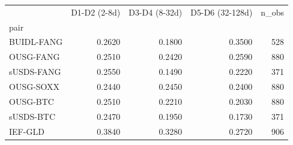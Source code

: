 \begin{tabular}{lrrrr}
\toprule
 & D1-D2 (2-8d) & D3-D4 (8-32d) & D5-D6 (32-128d) & n\_obs \\
pair &  &  &  &  \\
\midrule
BUIDL-FANG & 0.2620 & 0.1800 & 0.3500 & 528 \\
OUSG-FANG & 0.2510 & 0.2420 & 0.2590 & 880 \\
sUSDS-FANG & 0.2550 & 0.1490 & 0.2220 & 371 \\
OUSG-SOXX & 0.2440 & 0.2450 & 0.2400 & 880 \\
OUSG-BTC & 0.2510 & 0.2210 & 0.2030 & 880 \\
sUSDS-BTC & 0.2470 & 0.1950 & 0.1730 & 371 \\
IEF-GLD & 0.3840 & 0.3280 & 0.2720 & 906 \\
\bottomrule
\end{tabular}
